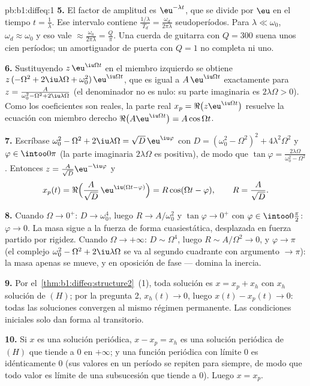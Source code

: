 \begin{solution}{pb:b1:diffeq:1}
\textbf{5.} El factor de amplitud es $\eu^{-\lambda t}$, que se divide
por $\eu$ en el tiempo $t = \frac1\lambda$. Ese intervalo contiene
$\frac{1/\lambda}{T_d} = \frac{\omega_d}{2\pi\lambda}$ seudoperíodos.
Para $\lambda \ll \omega_0$, $\omega_d \approx \omega_0$ y eso vale
$\approx \frac{\omega_0}{2\pi\lambda} = \frac Q\pi$. Una cuerda de
guitarra con $Q = 300$ suena unos cien períodos; un amortiguador de
puerta con $Q = 1$ no completa ni uno.

\textbf{6.} Sustituyendo $z\,\eu^{\iu\Omega t}$ en el miembro izquierdo
se obtiene $z\,(-\Omega^2 + 2\iu\lambda\Omega +
\omega_0^2)\,\eu^{\iu\Omega t}$, que es igual a
$A\,\eu^{\iu\Omega t}$ exactamente para $z = \frac{A}{\omega_0^2 -
\Omega^2 + 2\iu\lambda\Omega}$ (el denominador no es nulo: su parte
imaginaria es $2\lambda\Omega > 0$). Como los coeficientes son reales,
la parte real $x_p = \Re\bigl(z\eu^{\iu\Omega t}\bigr)$ resuelve la
ecuación con miembro derecho $\Re\bigl(A\eu^{\iu\Omega t}\bigr) =
A\cos\Omega t$.

\textbf{7.} Escríbase $\omega_0^2 - \Omega^2 + 2\iu\lambda\Omega =
\sqrt{D}\,\eu^{\iu\varphi}$ con $D = (\omega_0^2 - \Omega^2)^2 +
4\lambda^2\Omega^2$ y $\varphi \in \intoo0\pi$ (la parte imaginaria
$2\lambda\Omega$ es positiva), de modo que $\tan\varphi =
\frac{2\lambda\Omega}{\omega_0^2 - \Omega^2}$. Entonces
$z = \frac{A}{\sqrt D}\eu^{-\iu\varphi}$ y
\[
x_p(t) = \Re\Bigl(\frac A{\sqrt D}\,\eu^{\iu(\Omega t -
\varphi)}\Bigr) = R\cos(\Omega t - \varphi),
\qquad R = \frac A{\sqrt D} .
\]

\textbf{8.} Cuando $\Omega \to 0^+$: $D \to \omega_0^4$, luego
$R \to A/\omega_0^2$ y $\tan\varphi \to 0^+$ con
$\varphi \in \intoo0{\frac\pi2}$: $\varphi \to 0$. La masa sigue a la
fuerza de forma cuasiestática, desplazada en fuerza partido por
rigidez. Cuando $\Omega \to +\infty$: $D \sim \Omega^4$, luego
$R \sim A/\Omega^2 \to 0$, y $\varphi \to \pi$ (el complejo
$\omega_0^2 - \Omega^2 + 2\iu\lambda\Omega$ se va al segundo cuadrante
con argumento $\to \pi$): la masa apenas se mueve, y en oposición de
fase --- domina la inercia.

\textbf{9.} Por el~\cref{thm:b1:diffeq:structure2}~(1), toda solución
es $x = x_p + x_h$ con $x_h$ solución de $(H)$; por la pregunta 2,
$x_h(t) \to 0$, luego $x(t) - x_p(t) \to 0$: todas las soluciones
convergen al mismo régimen permanente. Las condiciones iniciales solo
dan forma al transitorio.

\textbf{10.} Si $x$ es una solución periódica, $x - x_p = x_h$ es una
solución periódica de $(H)$ que tiende a $0$ en $+\infty$; y una
función periódica con límite $0$ es idénticamente $0$ (sus valores en
un período se repiten para siempre, de modo que todo valor es límite de
una subsucesión que tiende a $0$). Luego $x = x_p$.


\end{solution}
